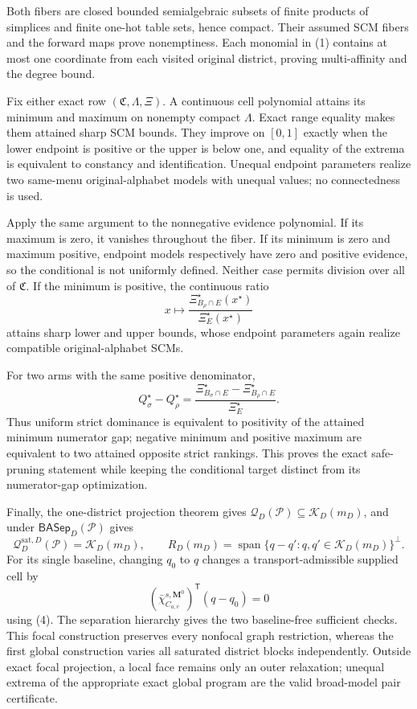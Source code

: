 Both fibers are closed bounded semialgebraic subsets of finite products of simplices and finite one-hot table sets, hence compact.  Their assumed SCM fibers and the forward maps prove nonemptiness.  Each monomial in (1) contains at most one coordinate from each visited original district, proving multi-affinity and the degree bound.

Fix either exact row \((\mathfrak C,\Lambda,\Xi)\).  A continuous cell polynomial attains its minimum and maximum on nonempty compact \(\Lambda\).  Exact range equality makes them attained sharp SCM bounds.  They improve on \([0,1]\) exactly when the lower endpoint is positive or the upper is below one, and equality of the extrema is equivalent to constancy and identification.  Unequal endpoint parameters realize two same-menu original-alphabet models with unequal values; no connectedness is used.

Apply the same argument to the nonnegative evidence polynomial.  If its maximum is zero, it vanishes throughout the fiber.  If its minimum is zero and maximum positive, endpoint models respectively have zero and positive evidence, so the conditional is not uniformly defined.  Neither case permits division over all of \(\mathfrak C\).  If the minimum is positive, the continuous ratio
\[
x\longmapsto
\frac{\Xi_{B_\rho\cap E}^\star(x^\star)}{\Xi_E^\star(x^\star)}
\tag{2}
\]
attains sharp lower and upper bounds, whose endpoint parameters again realize compatible original-alphabet SCMs.

For two arms with the same positive denominator,
\[
Q_\sigma^\star-Q_\rho^\star
=\frac{\Xi_{B_\sigma\cap E}^\star-
\Xi_{B_\rho\cap E}^\star}{\Xi_E^\star}.
\tag{3}
\]
Thus uniform strict dominance is equivalent to positivity of the attained minimum numerator gap; negative minimum and positive maximum are equivalent to two attained opposite strict rankings.  This proves the exact safe-pruning statement while keeping the conditional target distinct from its numerator-gap optimization.

Finally, the one-district projection theorem gives \(\mathcal Q_D(\mathcal P)\subseteq\mathcal K_D(m_D)\), and under \(\mathsf{BASep}_D(\mathcal P)\) gives
\[
\mathcal Q_D^{\mathrm{sat},D}(\mathcal P)=\mathcal K_D(m_D),
\qquad
R_D(m_D)=\operatorname{span}\{q-q':q,q'\in\mathcal K_D(m_D)\}^\perp.
\tag{4}
\]
For its single baseline, changing \(q_0\) to \(q\) changes a transport-admissible supplied cell by
\[
(\bar\chi_{C_{a,v}}^{s,\mathbf M^0})^{\mathsf T}(q-q_0)=0
\]
using (4).  The separation hierarchy gives the two baseline-free sufficient checks.  This focal construction preserves every nonfocal graph restriction, whereas the first global construction varies all saturated district blocks independently.  Outside exact focal projection, a local face remains only an outer relaxation; unequal extrema of the appropriate exact global program are the valid broad-model pair certificate.